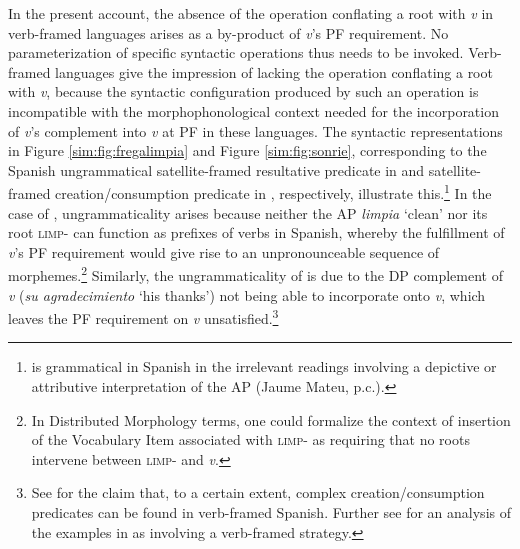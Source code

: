 \documentclass[output=paper,colorlinks,citecolor=brown]{langscibook}
\begin{document}
In the present account, the absence of the operation conflating a root with \textit{v} in verb-framed languages arises as a by-product of \textit{v}'s PF requirement. No parameterization of specific syntactic operations thus needs to be invoked. Verb-framed languages give the impression of lacking the operation conflating a root with \textit{v}, because the syntactic configuration produced by such an operation is incompatible with the morphophonological context needed for the incorporation of \textit{v}'s complement into \textit{v} at PF in these languages. The syntactic representations in Figure \ref{sim:fig:fregalimpia} and Figure \ref{sim:fig:sonrie}, corresponding to the Spanish ungrammatical %
satellite-framed resultative predicate in  and %
satellite-framed creation/consumption predicate in , respectively, illustrate this.\footnote{ is grammatical in Spanish in the irrelevant readings involving a depictive or attributive interpretation of the AP (Jaume Mateu, p.c.).%
} In the case of , ungrammaticality arises because neither the AP \textit{limpia} `clean' nor its root \textsc{limp-} can function as prefixes of verbs in Spanish, whereby the fulfillment of \textit{v}'s PF requirement would give rise to an unpronounceable sequence of morphemes.\footnote{In Distributed Morphology terms, one could formalize the context of insertion of the Vocabulary Item associated with \textsc{limp-} as requiring that no roots intervene between \textsc{limp-} and \textit{v}.} %
Similarly, the ungrammaticality of  is due to the DP complement of \textit{v} (\textit{su agradecimiento} `his thanks') not being able to incorporate onto \textit{v}, which leaves the PF requirement on \textit{v} unsatisfied.\footnote{See \citet{MartinezVazquez2014} for the claim that, to a certain extent, complex creation/con\-sump\-tion predicates can be found in verb-framed Spanish. Further see \citet{BigolinAndAusensi2021} for an analysis of the examples in \citet{MartinezVazquez2014} as involving a verb-framed strategy.}

 \z
\end{document}

